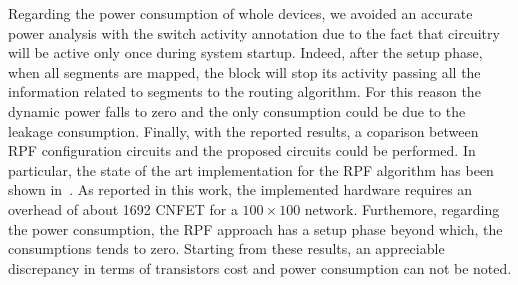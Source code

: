 Regarding the power consumption of whole \disr{} devices, 
we avoided an accurate power analysis with the switch activity
annotation due to the fact that \disr{} circuitry will be active 
only once during system startup. Indeed, after the setup phase, 
when all segments are mapped, the \disr{} block will stop its activity 
passing all the information related to segments to the routing
algorithm. For this reason the dynamic power falls to zero and
the only consumption could be due to the leakage
consumption. Finally, with the reported results, a coparison between 
RPF configuration circuits and the proposed circuits could be performed.
In particular, the state of the art implementation for the RPF algorithm has been shown in~\cite{patwardhan_nanoarch06}. As reported in this work,  the implemented hardware requires an overhead of about 1692 CNFET for a $100 \times 100$ network. Furthemore, regarding the power consumption, the RPF approach has a setup phase beyond which, the consumptions tends to zero. Starting from these results, an appreciable discrepancy in terms of transistors cost and power consumption can not be noted.
